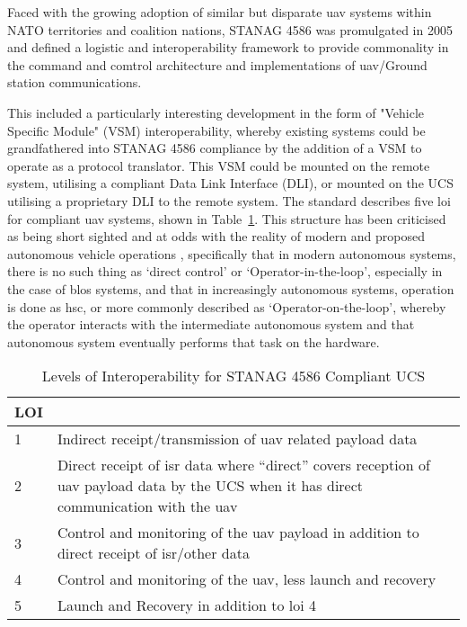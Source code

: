 Faced with the growing adoption of similar but disparate \gls{uav} systems within NATO territories and coalition nations, STANAG 4586\cite{STANAG4586} was promulgated in 2005 and defined a logistic and interoperability framework to provide commonality in the command and comtrol architecture and implementations of \gls{uav}/Ground station communications.

This included a particularly interesting development in the form of "Vehicle Specific Module" (VSM) interoperability, whereby existing systems could be grandfathered into STANAG 4586 compliance by the addition of a VSM to operate as a protocol translator.
This VSM could be mounted on the remote system, utilising a compliant Data Link Interface (DLI), or mounted on the UCS utilising a proprietary DLI to the remote system.
The standard describes five \gls{loi} for compliant \gls{uav} systems, shown in Table~\ref{tab:levels_of_interoperability}.
This structure has been criticised as being short sighted and at odds with the reality of modern and proposed autonomous vehicle operations \cite{Cummings2010}, specifically that in modern autonomous systems, there is no such thing as ‘direct control’ or ‘Operator-in-the-loop’, especially in the case of \gls{blos} systems, and that in increasingly autonomous systems, operation is done as \gls{hsc}, or more commonly described as ‘Operator-on-the-loop’, whereby the operator interacts with the intermediate autonomous system and that autonomous system eventually performs that task on the hardware.

\begin{table}
  \begin{tabularx}{\textwidth}{|l|X|}
    \hline  LOI &  \\ 
    \hline  1 &  Indirect receipt/transmission of \gls{uav} related payload data\\ 
    \hline  2 &  Direct receipt of \gls{isr} data where “direct” covers reception of \gls{uav} payload data by the UCS when it has direct communication with the \gls{uav}\\ 
    \hline  3 &  Control and monitoring of the \gls{uav} payload in addition to direct receipt of \gls{isr}/other data\\ 
    \hline  4 &  Control and monitoring of the \gls{uav}, less launch and recovery\\
    \hline  5 &  Launch and Recovery in addition to \gls{loi} 4\\ 
    \hline 
  \end{tabularx}
  \caption[\gls{loi} for STANAG 4586 Compliant UCS]{Levels of Interoperability for STANAG 4586 Compliant UCS \cite{STANAG4596}}
  \label{tab:levels_of_interoperability}
\end{table}

